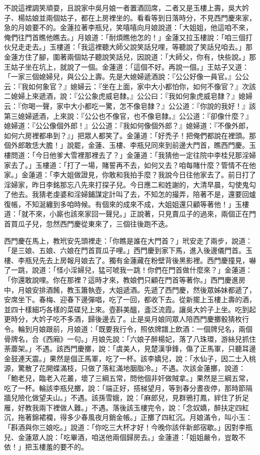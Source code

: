 \begin{showcontents}{}
不說這裡調笑頑耍，且說家中吳月娘一者置酒回席，二者又是玉樓上壽，吳大妗子、楊姑娘並兩個姑子，都在上房裡坐的。看看等到日落時分，不見西門慶來家，急的月娘要不的。金蓮拉著李瓶兒，笑嘻嘻向月娘說道：「大姐姐，他這咱不來，俺們往門首瞧他瞧去。」月娘道：「耐煩瞧他怎的！」金蓮又拉玉樓說：「咱三個打伙兒走走去。」玉樓道：「我這裡聽大師父說笑話兒哩，等聽說了笑話兒咱去。」那金蓮方住了腳，圍著兩個姑子聽說笑話兒，因說道：「大師父，你有，快些說。」那王姑子坐在坑上，就說了一個。金蓮道：「這個不好。再說一個。」王姑子又道：「一家三個媳婦兒，與公公上壽。先是大媳婦遞酒說：『公公好像一員官。』公公云：『我如何象官？』媳婦云：『坐在上面，家中大小都怕你，如何不像官？』次該二媳婦上來遞酒，說：『公公象虎威皂隸。』公公曰：『我如何象虎威皂隸？』媳婦云：『你喝一聲，家中大小都吃一驚，怎不像皂隸？』公公道：『你說的我好！』該第三媳婦遞酒，上來說：『公公也不像官，也不像皂隸。』公公道：『卻像什麼？』媳婦道：『公公像個外郎！』公公道：『我如何像個外郎？』媳婦道：『不像外郎，如何六房裡都串到？』」把眾人都笑了。金蓮道：「好禿子！把俺們都說在裡頭。那個外郎敢恁大膽！」說罷，金蓮、玉樓、李瓶兒同來到前邊大門首，瞧西門慶。玉樓問道：「今日他爹大雪裡那裡去了？」金蓮道：「我猜他一定往院中李桂兒那淫婦家去了。」玉樓道：「打了一場，賭誓再不去，如何又去？咱每賭什麼？管情不在他家。」金蓮道：「李大姐做證見，你敢和我拍手麼？我說今日往他家去了。前日打了淫婦家，昨日李銘那忘八先來打探子兒。今日應二和姓謝的，大清早晨，勾使鬼勾了他去。我猜老虔婆和淫婦鋪謀定計叫了去，不知怎的撮弄，陪著不是，還要回爐復帳，不知涎纏到多咱時候。有個來的成來不成，大姐姐還只顧等著他！」玉樓道：「就不來，小廝也該來家回一聲兒。」正說著，只見賣瓜子的過來，兩個正在門首買瓜子兒，忽然西門慶從東來了，三個往後跑不迭。

西門慶在馬上，教玳安先頭裡走：「你瞧是誰在大門首？」玳安走了兩步，說道：「是三娘、五娘、六娘在門首買瓜子哩。」西門慶到家下馬，進入後邊儀門首。玉樓、李瓶兒先去上房報月娘去了。獨有金蓮藏在粉壁背後黑影裡。西門慶撞見，嚇了一跳，說道：「怪小淫婦兒，猛可唬我一跳！你們在門首做什麼來？」金蓮道： 「你還敢說哩。你在那裡？這時才來，教娘們只顧在門首等著你。」西門慶進房中，月娘安排酒餚，教玉簫執壺，大姐遞酒。先遞了西門慶，然後眾姊妹都遞了，安席坐下。春梅、迎春下邊彈唱，吃了一回，都收下去。從新擺上玉樓上壽的酒，並四十樣細巧各樣的菜碟兒上來。壺斟美醞，盞泛流霞。讓吳大妗子上坐。吃到起更時分，大妗子吃不多酒，歸後邊去了。止是吳月娘同眾人陪西門慶擲骰猜枚行令。輪到月娘跟前，月娘道：「既要我行令，照依牌譜上飲酒：一個牌兒名，兩個骨牌名，合《西廂》一句。」月娘先說：「六娘子醉楊妃，落了八珠環，游絲兒抓住荼蘼架。」不遇。該西門慶擲，說：「虞美人，見楚漢爭鋒，傷了正馬軍，只聽耳邊金鼓連天震。」果然是個正馬軍，吃了一杯。該李嬌兒，說：「水仙子，因二士入桃源，驚散了花開蝶滿枝，只做了落紅滿地胭脂冷。」不遇。次該金蓮擲，說道： 「鮑老兒，臨老入花叢，壞了三綱五常，問他個非奸做賊拿。」果然是三綱五常，吃了一杯。輪該李瓶兒擲，說：「端正好，搭梯望月，等到春分晝夜停，那時節隔牆兒險化做望夫山。」不遇。該孫雪娥，說：「麻郎兒，見群鴉打鳳，絆住了折足雁，好教我兩下裡做人難。」不遇。落後該玉樓完令，說：「念奴嬌，醉扶定四紅沉，拖著錦裙襴，得多少春風夜月銷金帳。」正擲了四紅沉。月娘滿令，叫小玉：「斟酒與你三娘吃。」說道：「你吃三大杯才好！今晚你該伴新郎宿歇。」因對李瓶兒、金蓮眾人說：「吃畢酒，咱送他兩個歸房去。」金蓮道：「姐姐嚴令，豈敢不依！」把玉樓羞的要不的。


\end{showcontents}
